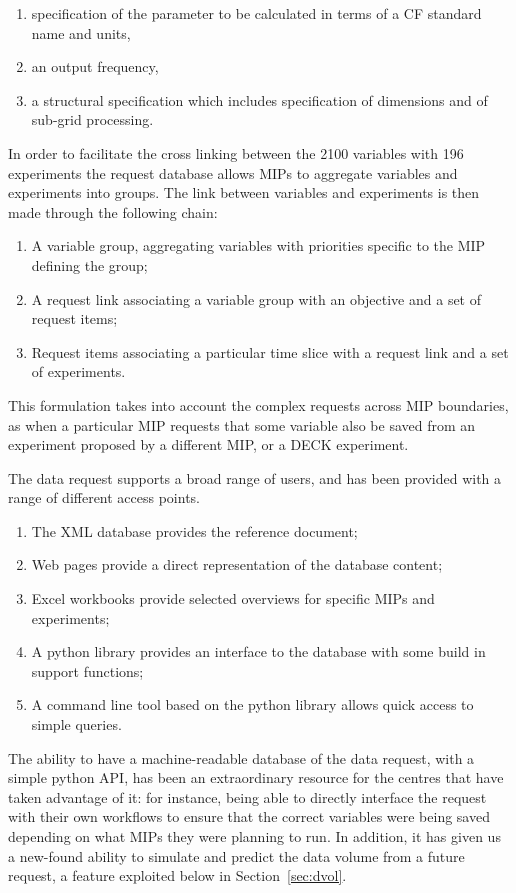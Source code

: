 \documentclass[gmd,manuscript]{copernicus}
\newcommand{\secref}[1] {\mbox{Section  \ref{sec:#1}}}
\begin{document}
\begin{enumerate}
\item specification of the parameter to be calculated in terms of a CF
  standard name and units,
\item an output frequency,
\item a structural specification which includes specification of
  dimensions and of sub-grid processing.
\end{enumerate}

In order to facilitate the cross linking between the 2100 variables
with 196 experiments the request database allows MIPs to aggregate
variables and experiments into groups. The link between variables and
experiments is then made through the following chain:

\begin{enumerate}
\item A variable group, aggregating variables with priorities specific
  to the MIP defining the group;
\item A request link associating a variable group with an objective and
  a set of request items;
\item Request items associating a particular time slice with a
  request link and a set of experiments.
\end{enumerate}

This formulation takes into account the complex requests across MIP
boundaries, as when a particular MIP requests that some variable also
be saved from an experiment proposed by a different MIP, or a DECK
experiment.

The data request supports a broad range of users, and has been
provided with a range of different access points.

\begin{enumerate}
\item The XML database provides the reference document;
\item Web pages provide a direct representation of the database
  content;
\item Excel workbooks provide selected overviews for specific MIPs and
  experiments;
\item A python library provides an interface to the database with some
  build in support functions;
\item A command line tool based on the python library allows quick
  access to simple queries.
\end{enumerate}


The ability to have a machine-readable database of the data request,
with a simple python API, has been an extraordinary resource for the
centres that have taken advantage of it: for instance, being able to
directly interface the request with their own workflows to ensure that
the correct variables were being saved depending on what MIPs they
were planning to run. In addition, it has given us a new-found ability
to simulate and predict the data volume from a future request, a
feature exploited below in \secref{dvol}.
\end{document}
